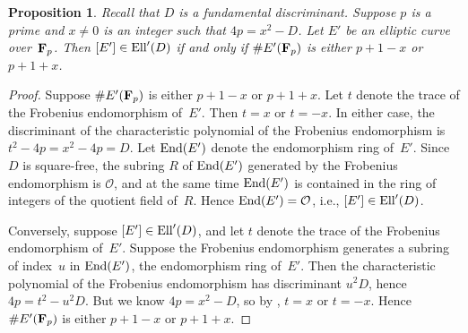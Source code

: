 \documentclass{amsart}
\newcommand{\F}{{\bf{F}}}
\newcommand{\OO}{\mathcal{O}}
\newcommand{\Ell}{{\rm{Ell}}}
\theoremstyle{plain}
\newtheorem{prop}[lem]{Proposition}
\begin{document}
\begin{prop} \label{prop:points} Recall that $D$ is a fundamental discriminant.
Suppose $p$ is a prime and $x \ne 0$ is an integer  such that \mbox{$4p = x^2 -D$}.
Let $E'$ be an elliptic curve over~$\F_p$.
Then $[E'] \in \Ell'(D)$ if and only if
$\# E'(\F_p)$ is either $p+1-x$ or $p+1+x$.
\end{prop}

\begin{proof}
Suppose $\# E'(\F_p)$ is either $p+1-x$ or $p+1+x$.
Let $t$ denote the trace of the Frobenius
endomorphism of~$E'$.  Then $t=x$ or $t=-x$.
In either case, the discriminant of the characteristic
polynomial of the Frobenius endomorphism
is $t^2 - 4p = x^2 - 4p = D$. Let ${\rm End}(E')$ denote
the endomorphism ring of~$E'$. 
Since $D$ is square-free, the subring $R$ of ${\rm End}(E')$ generated by
the Frobenius endomorphism is $\OO$, and at the 
same time ${\rm End}(E')$ is contained in the ring
of integers of the quotient field of~$R$.
Hence ${\rm End}(E') = \OO$, i.e., $[E'] \in \Ell'(D)$. 

Conversely, suppose $[E'] \in \Ell'(D)$,
and let $t$ denote the trace of the Frobenius
endomorphism of~$E'$. Suppose the Frobenius
endomorphism generates a subring of index~$u$
in ${\rm End}(E')$, the endomorphism ring of~$E'$. 
Then the characteristic polynomial of the Frobenius endomorphism
has discriminant $u^2 D$, hence $4p = t^2 - u^2 D$.
But we know $4p = x^2 - D$, so by \cite[Ex.~14.17]{cox},
$t = x$ or $t = -x$. Hence 
$\# E'(\F_p)$ is either $p+1-x$ or $p+1+x$.
\end{proof}
\end{document}

